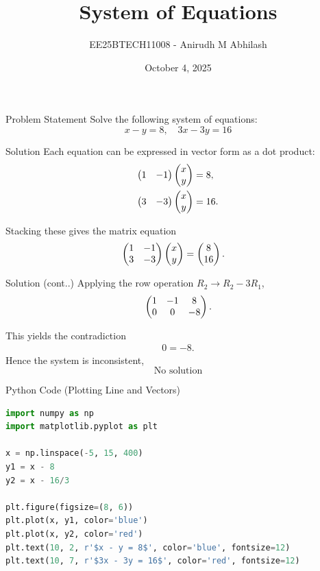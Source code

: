 \documentclass{beamer}
\title{System of Equations}
\author{EE25BTECH11008 - Anirudh M Abhilash}
\date{October 4, 2025}
\begin{document}
\begin{frame}
\titlepage
\end{frame}

\begin{frame}{Problem Statement}
Solve the following system of equations:
\[
x - y = 8, \quad 3x - 3y = 16
\]
\end{frame}

\begin{frame}{Solution}
Each equation can be expressed in vector form as a dot product:
\begin{align}
\begin{pmatrix}1 & -1\end{pmatrix}\begin{pmatrix}x \\ y\end{pmatrix} &= 8, \\
\begin{pmatrix}3 & -3\end{pmatrix}\begin{pmatrix}x \\ y\end{pmatrix} &= 16.
\end{align}

Stacking these gives the matrix equation
\begin{align}
\begin{pmatrix}1 & -1 \\ 3 & -3\end{pmatrix}\begin{pmatrix}x \\ y\end{pmatrix} &= \begin{pmatrix}8 \\ 16\end{pmatrix}.
\end{align}
\end{frame}

\begin{frame}{Solution (cont..)}
Applying the row operation $R_2 \to R_2 - 3R_1$,
\begin{align}
\begin{pmatrix}1 & -1 & 8 \\ 0 & 0 & -8\end{pmatrix}.
\end{align}

This yields the contradiction
\begin{align}
0 = -8.
\end{align}
Hence the system is inconsistent,
\[
\boxed{\text{No solution}}
\]

\end{frame}

\begin{frame}[fragile]{Python Code (Plotting Line and Vectors)}
\begin{lstlisting}[language=Python]
import numpy as np
import matplotlib.pyplot as plt

x = np.linspace(-5, 15, 400)
y1 = x - 8
y2 = x - 16/3

plt.figure(figsize=(8, 6))
plt.plot(x, y1, color='blue')
plt.plot(x, y2, color='red')
plt.text(10, 2, r'$x - y = 8$', color='blue', fontsize=12)
plt.text(10, 7, r'$3x - 3y = 16$', color='red', fontsize=12)

\end{lstlisting}
\end{frame}
\end{document}
